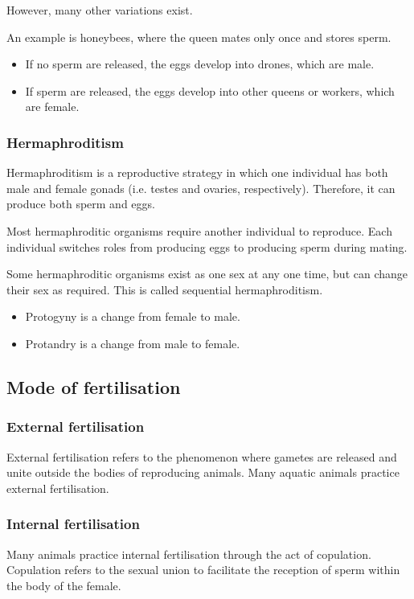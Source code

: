 \documentclass[11pt]{article}
\begin{document}
However, many other variations exist.


An example is honeybees, where the queen mates only once and stores sperm.
\begin{itemize}
\item If no sperm are released, the eggs develop into drones, which are male.
\item If sperm are released, the eggs develop into other queens or workers, which are female.
\end{itemize}
\subsubsection{Hermaphroditism}
\label{sec:orged3a9b9}
Hermaphroditism is a reproductive strategy in which one individual has both male and female gonads (i.e. testes and ovaries, respectively). Therefore, it can produce both sperm and eggs.


Most hermaphroditic organisms require another individual to reproduce. Each individual switches roles from producing eggs to producing sperm during mating.


Some hermaphroditic organisms exist as one sex at any one time, but can change their sex as required. This is called sequential hermaphroditism.
\begin{itemize}
\item Protogyny is a change from female to male.
\item Protandry is a change from male to female.
\end{itemize}
\subsection{Mode of fertilisation}
\label{sec:orgfeb4400}

\subsubsection{External fertilisation}
\label{sec:org9253fad}
External fertilisation refers to the phenomenon where gametes are released and unite outside the bodies of reproducing animals. Many aquatic animals practice external fertilisation.
\subsubsection{Internal fertilisation}
\label{sec:org6481b77}
Many animals practice internal fertilisation through the act of copulation. Copulation refers to the sexual union to facilitate the reception of sperm within the body of the female.
\end{document}
